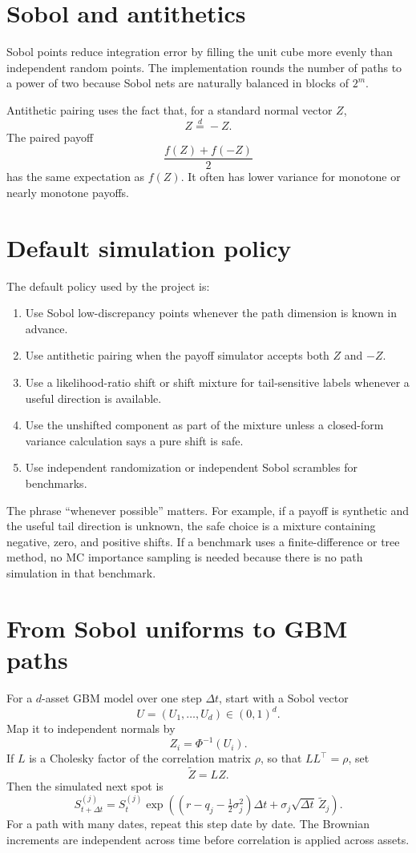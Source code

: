 \documentclass[11pt,oneside]{book}
\theoremstyle{definition}
\begin{document}
\section{Sobol and antithetics}
Sobol points reduce integration error by filling the unit cube more evenly than independent random points. The implementation rounds the number of paths to a power of two because Sobol nets are naturally balanced in blocks of \(2^m\).

Antithetic pairing uses the fact that, for a standard normal vector \(Z\),
\[
  Z \stackrel{d}= -Z.
\]
The paired payoff
\[
  \frac{f(Z)+f(-Z)}{2}
\]
has the same expectation as \(f(Z)\). It often has lower variance for monotone or nearly monotone payoffs.

\section{Default simulation policy}
The default policy used by the project is:
\begin{enumerate}
  \item Use Sobol low-discrepancy points whenever the path dimension is known in advance.
  \item Use antithetic pairing when the payoff simulator accepts both \(Z\) and \(-Z\).
  \item Use a likelihood-ratio shift or shift mixture for tail-sensitive labels whenever a useful direction is available.
  \item Use the unshifted component as part of the mixture unless a closed-form variance calculation says a pure shift is safe.
  \item Use independent randomization or independent Sobol scrambles for benchmarks.
\end{enumerate}
The phrase ``whenever possible'' matters. For example, if a payoff is synthetic and the useful tail direction is unknown, the safe choice is a mixture containing negative, zero, and positive shifts. If a benchmark uses a finite-difference or tree method, no MC importance sampling is needed because there is no path simulation in that benchmark.

\section{From Sobol uniforms to GBM paths}
For a \(d\)-asset GBM model over one step \(\Delta t\), start with a Sobol vector
\[
  U=(U_1,\ldots,U_d)\in(0,1)^d.
\]
Map it to independent normals by
\[
  Z_i=\Phi^{-1}(U_i).
\]
If \(L\) is a Cholesky factor of the correlation matrix \(\rho\), so that \(LL^\top=\rho\), set
\[
  \widetilde Z=LZ.
\]
Then the simulated next spot is
\[
  S_{t+\Delta t}^{(j)}
  =
  S_t^{(j)}
  \exp\!\left((r-q_j-\tfrac12\sigma_j^2)\Delta t
       +\sigma_j\sqrt{\Delta t}\,\widetilde Z_j\right).
\]
For a path with many dates, repeat this step date by date. The Brownian increments are independent across time before correlation is applied across assets.
\end{document}

